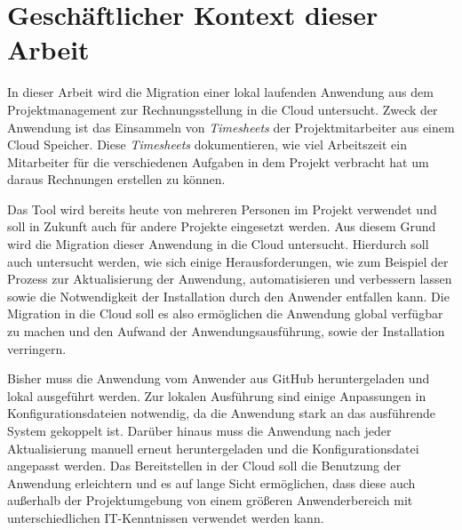 \section{Geschäftlicher Kontext dieser Arbeit}

In dieser Arbeit wird die Migration einer lokal laufenden Anwendung aus dem Projektmanagement zur Rechnungsstellung in die Cloud untersucht. Zweck der Anwendung ist das Einsammeln von \textit{\glspl{Timesheet}} der Projektmitarbeiter aus einem Cloud Speicher. Diese \textit{\glspl{Timesheet}} dokumentieren, wie viel Arbeitszeit ein Mitarbeiter für die verschiedenen Aufgaben in dem Projekt verbracht hat um daraus Rechnungen erstellen zu können.

Das Tool wird bereits heute von mehreren Personen im Projekt verwendet und soll in Zukunft auch für andere Projekte eingesetzt werden. Aus diesem Grund wird die Migration dieser Anwendung in die Cloud untersucht.
Hierdurch soll auch untersucht werden, wie sich einige Herausforderungen, wie zum Beispiel der Prozess zur Aktualisierung der Anwendung, automatisieren und verbessern lassen sowie die Notwendigkeit der Installation durch den Anwender entfallen kann. Die Migration in die Cloud soll es also ermöglichen die Anwendung global verfügbar zu machen und den Aufwand der Anwendungsausführung, sowie der Installation verringern.

Bisher muss die Anwendung vom Anwender aus GitHub heruntergeladen und lokal ausgeführt werden. Zur lokalen Ausführung sind einige Anpassungen in Konfigurationsdateien notwendig, da die Anwendung stark an das ausführende System gekoppelt ist. Darüber hinaus muss die Anwendung nach jeder Aktualisierung manuell erneut heruntergeladen und die Konfigurationsdatei angepasst werden. Das Bereitstellen in der Cloud soll die Benutzung der Anwendung erleichtern und es auf lange Sicht ermöglichen, dass diese auch außerhalb der Projektumgebung von einem größeren Anwenderbereich mit unterschiedlichen IT-Kenntnissen verwendet werden kann.